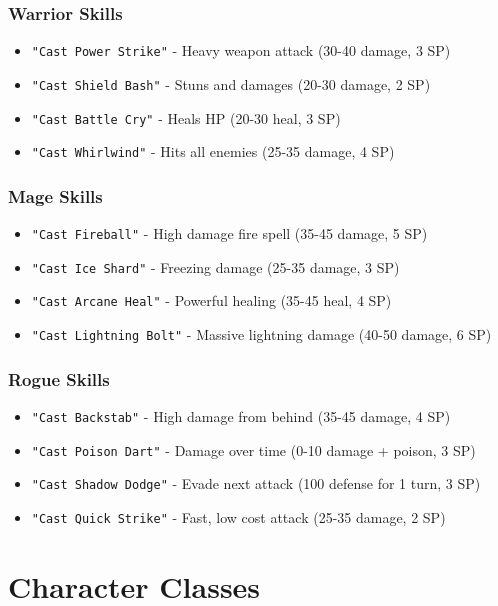 \documentclass[12pt]{article}
\begin{document}
\subsubsection{Warrior Skills}
\begin{itemize}
    \item \texttt{"Cast Power Strike"} - Heavy weapon attack (30-40 damage, 3 SP)
    \item \texttt{"Cast Shield Bash"} - Stuns and damages (20-30 damage, 2 SP)
    \item \texttt{"Cast Battle Cry"} - Heals HP (20-30 heal, 3 SP)
    \item \texttt{"Cast Whirlwind"} - Hits all enemies (25-35 damage, 4 SP)
\end{itemize}

\subsubsection{Mage Skills}
\begin{itemize}
    \item \texttt{"Cast Fireball"} - High damage fire spell (35-45 damage, 5 SP)
    \item \texttt{"Cast Ice Shard"} - Freezing damage (25-35 damage, 3 SP)
    \item \texttt{"Cast Arcane Heal"} - Powerful healing (35-45 heal, 4 SP)
    \item \texttt{"Cast Lightning Bolt"} - Massive lightning damage (40-50 damage, 6 SP)
\end{itemize}

\subsubsection{Rogue Skills}
\begin{itemize}
    \item \texttt{"Cast Backstab"} - High damage from behind (35-45 damage, 4 SP)
    \item \texttt{"Cast Poison Dart"} - Damage over time (0-10 damage + poison, 3 SP)
    \item \texttt{"Cast Shadow Dodge"} - Evade next attack (100 defense for 1 turn, 3 SP)
    \item \texttt{"Cast Quick Strike"} - Fast, low cost attack (25-35 damage, 2 SP)
\end{itemize}

\section{Character Classes}
\label{sec:character-classes}
\end{document}

